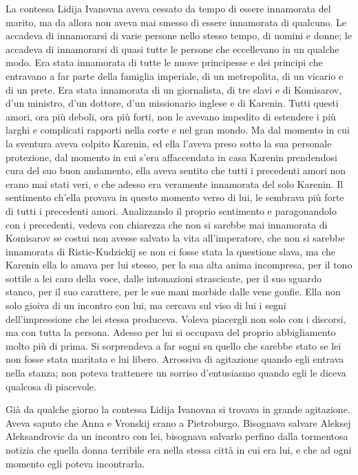 La contessa Lidija Ivanovna aveva cessato da tempo di essere innamorata del marito, ma da allora non aveva mai smesso di essere innamorata di qualcuno. Le accadeva di innamorarsi di varie persone nello stesso tempo, di uomini e donne; le accadeva di innamorarsi di quasi tutte le persone che eccellevano in un qualche modo. Era stata innamorata di tutte le nuove principesse e dei principi che entravano a far parte della famiglia imperiale, di un metropolita, di un vicario e di un prete. Era stata innamorata di un giornalista, di tre slavi e di Komisarov, d'un ministro, d'un dottore, d'un missionario inglese e di Karenin. Tutti questi amori, ora più deboli, ora più forti, non le avevano impedito di estendere i più larghi e complicati rapporti nella corte e nel gran mondo. Ma dal momento in cui la sventura aveva colpito Karenin, ed ella l'aveva preso sotto la sua personale protezione, dal momento in cui s'era affaccendata in casa Karenin prendendosi cura del suo buon andamento, ella aveva sentito che tutti i precedenti amori non erano mai stati veri, e che adesso era veramente innamorata del solo Karenin. Il sentimento ch'ella provava in questo momento verso di lui, le sembrava più forte di tutti i precedenti amori. Analizzando il proprio sentimento e paragonandolo con i precedenti, vedeva con chiarezza che non si sarebbe mai innamorata di Komisarov se costui non avesse salvato la vita all'imperatore, che non si sarebbe innamorata di Ristic-Kudzickij se non ci fosse stata la questione slava, ma che Karenin ella lo amava per lui stesso, per la sua alta anima incompresa, per il tono sottile a lei caro della voce, dalle intonazioni strascicate, per il suo sguardo stanco, per il suo carattere, per le sue mani morbide dalle vene gonfie. Ella non solo gioiva di un incontro con lui, ma cercava sul viso di lui i segni dell'impressione che lei stessa produceva. Voleva piacergli non solo con i discorsi, ma con tutta la persona. Adesso per lui si occupava del proprio abbigliamento molto più di prima. Si sorprendeva a far sogni su quello che sarebbe stato se lei non fosse stata maritata e lui libero. Arrossiva di agitazione quando egli entrava nella stanza; non poteva trattenere un sorriso d'entusiasmo quando egli le diceva qualcosa di piacevole. 

Già da qualche giorno la contessa Lidija Ivanovna si trovava in grande agitazione. Aveva saputo che Anna e Vronskij erano a Pietroburgo. Bisognava salvare Aleksej Aleksandrovic da un incontro con lei, bisognava salvarlo perfino dalla tormentosa notizia che quella donna terribile era nella stessa città in cui era lui, e che ad ogni momento egli poteva incontrarla. 

